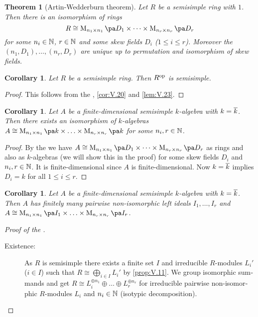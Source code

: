 \documentclass[12pt,a4paper]{scrartcl}
\theoremstyle{cplain}
\newtheorem{cor}[thmcounter]{Corollary}
\theoremstyle{cplain}
\newtheorem{thm}[thmcounter]{Theorem}
\theoremstyle{cplain}
\theoremstyle{definition}
\begin{document}
\begin{otherlanguage}{english}
\begin{thm}[Artin-Wedderburn theorem] \label{thm:aw} %
  Let $R$ be a semisimple ring with $1$. Then there is an isomorphism of rings \[ R \cong \Mat{n_1}{D_1}\times \cdots \times \Mat{n_r}{D_r}\] for some $n_i \in \mathbb N$, $r\in \mathbb N$ and some skew fields $D_i$ ($1\le i\le r$). Moreover the $(n_1,D_1),\ldots,(n_r,D_r)$ are unique up to permutation and isomorphism of skew fields.
\end{thm}

\begin{cor}
  Let $R$ be a semisimple ring. Then $R^{\operatorname{op}}$ is semisimple.
\end{cor}
\begin{proof}
  This follows from the , \cref{cor:V.20} and \cref{lem:V.23}.
\end{proof}

\begin{cor}
  Let $A$ be a finite-dimensional semisimple $k$-algebra with $k=\overline k$. Then there exists an isomorphism of $k$-algebras $A\cong \Mat{n_1}{k}\times \ldots \times \Mat{n_r}{k}$ for some $n_i,r\in \mathbb N$.
\end{cor}
\begin{proof}
  By the  we have $A \cong \Mat {n_1}{D_1} \times\cdots\times \Mat {n_r}{D_r}$ as rings and also as $k$-algebras (we will show this in the proof) for some skew fields $D_i$ and $n_i,r\in\mathbb N$. It is finite-dimensional since $A$ is finite-dimensional. Now $k=\overline k$ implies $D_i = k$ for all $1\le i\le r$.
\end{proof}


\begin{cor} \label{cor:V.29} %
  Let $A$ be a finite-dimensional semisimple $k$-algebra with $k=\overline k$. Then $A$ has finitely many pairwise non-isomorphic left ideals $I_1,\ldots,I_r$ and $A\cong \Mat{n_1}{I_1}\times \ldots \times \Mat{n_r}{I_r}$.
\end{cor}


\begin{proof}[Proof of the ]
  \leavevmode
  \begin{description}
    \item[Existence:] As $R$ is semisimple there exists a finite set $I$ and irreducible $R$-modules $L_i'$ ($i\in I$) such that $R\cong\bigoplus_{i\in I}L_i'$ by \cref{prop:V.11}. We group isomorphic summands and get $R \cong L_i^{\oplus n_1}\oplus \ldots \oplus L_r^{\oplus n_r}$ for irreducible pairwise non-isomorphic $R$-modules $L_i$ and $n_i\in \mathbb N$ (isotypic decomposition).
    

\end{description}
\end{proof}
\end{otherlanguage}
\end{document}
